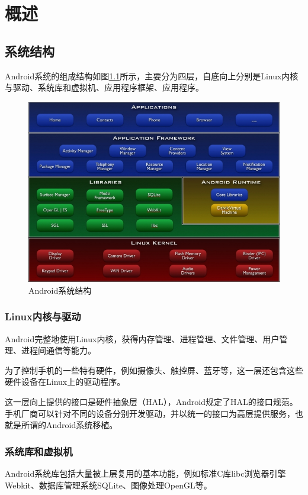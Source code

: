 \chapter{概述}
\section{系统结构}
Android系统的组成结构如图\ref{Fig:system-architecture}所示，主要分为四层，自底向上分别是Linux内核与驱动、系统库和虚拟机、应用程序框架、应用程序。
\begin{figure}[htbp]
  \centering
  \includegraphics[width=14cm]{image/system-architecture.jpg}
  \caption{Android系统结构}
  \label{Fig:system-architecture}
\end{figure}

\subsection{Linux内核与驱动}
Android完整地使用Linux内核，获得内存管理、进程管理、文件管理、用户管理、进程间通信等能力。

为了控制手机的一些特有硬件，例如摄像头、触控屏、蓝牙等，这一层还包含这些硬件设备在Linux上的驱动程序。

这一层向上提供的接口是硬件抽象层（HAL），Android规定了HAL的接口规范。手机厂商可以针对不同的设备分别开发驱动，并以统一的接口为高层提供服务，也就是所谓的Android系统移植。

\subsection{系统库和虚拟机}
Android系统库包括大量被上层复用的基本功能，例如标准C库libc浏览器引擎Webkit、数据库管理系统SQLite、图像处理OpenGL等。

